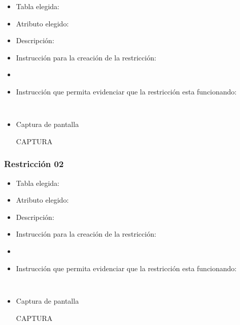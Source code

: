 \begin{itemize} 
  \item Tabla elegida: 
  \item Atributo elegido: 
  \item Descripción: 
  \item Instrucción para la creación de la restricción: 
  \item 
    \begin{verbatim} 
    
    \end{verbatim} 

  \item Instrucción que permita evidenciar que la restricción esta funcionando: 
  
    \begin{verbatim} 
    
    \end{verbatim} 

  \item Captura de pantalla 
  
    \begin{center} 
      CAPTURA
    \end{center} 

\end{itemize}


\subsubsection*{Restricción 02}

\begin{itemize} 
  \item Tabla elegida: 
  \item Atributo elegido: 
  \item Descripción: 
  \item Instrucción para la creación de la restricción: 
  \item 
    \begin{verbatim} 
    
    \end{verbatim} 

  \item Instrucción que permita evidenciar que la restricción esta funcionando: 
  
    \begin{verbatim} 
    
    \end{verbatim} 

  \item Captura de pantalla 
  
    \begin{center} 
      CAPTURA
    \end{center} 

\end{itemize}



